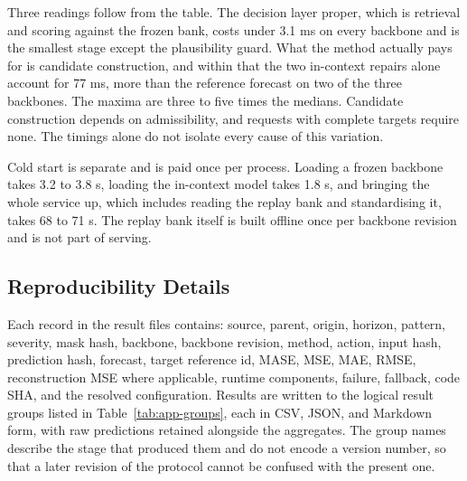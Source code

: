 \documentclass{article}
\begin{document}
Three readings follow from the table. The decision layer proper, which is retrieval and
scoring against the frozen bank, costs under 3.1 ms on every backbone and is the smallest
stage except the plausibility guard. What the method actually pays for is candidate
construction, and within that the two in-context repairs alone account for 77 ms, more than
the reference forecast on two of the three backbones. The maxima are three to five times the
medians. Candidate construction depends on admissibility, and requests with complete targets
require none. The timings alone do not isolate every cause of this variation.

Cold start is separate and is paid once per process. Loading a frozen backbone takes 3.2 to
3.8 s, loading the in-context model takes 1.8 s, and bringing the whole service up, which
includes reading the replay bank and standardising it, takes 68 to 71 s. The replay bank
itself is built offline once per backbone revision and is not part of serving.

\subsection{Reproducibility Details}
\label{app:reprodetails}
Each record in the result files contains: source, parent, origin, horizon, pattern,
severity, mask hash, backbone, backbone revision, method, action, input hash, prediction
hash, forecast, target reference id, MASE, MSE, MAE, RMSE, reconstruction MSE where
applicable, runtime components, failure, fallback, code SHA, and the resolved configuration.
Results are written to the logical result groups listed in Table~\ref{tab:app-groups}, each in
CSV, JSON, and Markdown form, with raw predictions retained alongside the aggregates. The
group names describe the stage that produced them and do not encode a version number, so that
a later revision of the protocol cannot be confused with the present one.
\end{document}
